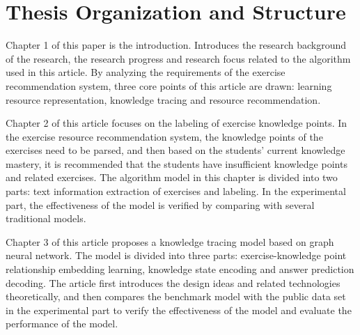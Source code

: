 \section{Thesis Organization and Structure}


Chapter 1 of this paper is the introduction. Introduces the research background of the research, the research progress and research focus related to the algorithm used in this article. By analyzing the requirements of the exercise recommendation system, three core points of this article are drawn: learning resource representation, knowledge tracing and resource recommendation.

Chapter 2 of this article focuses on the labeling of exercise knowledge points. In the exercise resource recommendation system, the knowledge points of the exercises need to be parsed, and then based on the students' current knowledge mastery, it is recommended that the students have insufficient knowledge points and related exercises. The algorithm model in this chapter is divided into two parts: text information extraction of exercises and labeling. In the experimental part, the effectiveness of the model is verified by comparing with several traditional models.

Chapter 3 of this article proposes a knowledge tracing model based on graph neural network. The model is divided into three parts: exercise-knowledge point relationship embedding learning, knowledge state encoding and answer prediction decoding. The article first introduces the design ideas and related technologies theoretically, and then compares the benchmark model with the public data set in the experimental part to verify the effectiveness of the model and evaluate the performance of the model.

